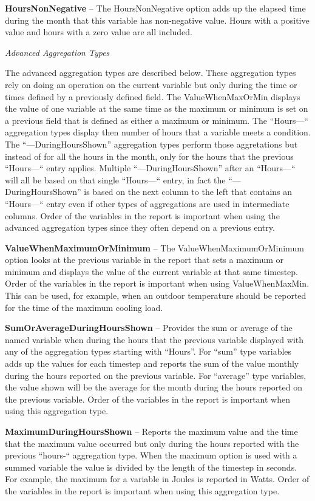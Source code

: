 \textbf{HoursNonNegative} -- The HoursNonNegative option adds up the elapsed time during the month that this variable has non-negative value. Hours with a positive value and hours with a zero value are all included.

\emph{Advanced Aggregation Types}

The advanced aggregation types are described below. These aggregation types rely on doing an operation on the current variable but only during the time or times defined by a previously defined field. The ValueWhenMaxOrMin displays the value of one variable at the same time as the maximum or minimum is set on a previous field that is defined as either a maximum or minimum. The ``Hours---`` aggregation types display then number of hours that a variable meets a condition. The ``---DuringHoursShown'' aggregation types perform those aggretations but instead of for all the hours in the month, only for the hours that the previous ``Hours---`` entry applies. Multiple ``---DuringHoursShown'' after an ``Hours---`` will all be based on that single ``Hours---`` entry, in fact the ``---DuringHoursShown'' is based on the next column to the left that contains an ``Hours---`` entry even if other types of aggregations are used in intermediate columns. Order of the variables in the report is important when using the advanced aggregation types since they often depend on a previous entry.

\textbf{ValueWhenMaximumOrMinimum} -- The ValueWhenMaximumOrMinimum option looks at the previous variable in the report that sets a maximum or minimum and displays the value of the current variable at that same timestep. Order of the variables in the report is important when using ValueWhenMaxMin. This can be used, for example, when an outdoor temperature should be reported for the time of the maximum cooling load.

\textbf{SumOrAverageDuringHoursShown} -- Provides the sum or average of the named variable when during the hours that the previous variable displayed with any of the aggregation types starting with ``Hours''. For ``sum'' type variables adds up the values for each timestep and reports the sum of the value monthly during the hours reported on the previous variable. For ``average'' type variables, the value shown will be the average for the month during the hours reported on the previous variable. Order of the variables in the report is important when using this aggregation type.

\textbf{MaximumDuringHoursShown} -- Reports the maximum value and the time that the maximum value occurred but only during the hours reported with the previous ``hours-`` aggregation type. When the maximum option is used with a summed variable the value is divided by the length of the timestep in seconds. For example, the maximum for a variable in Joules is reported in Watts. Order of the variables in the report is important when using this aggregation type.

